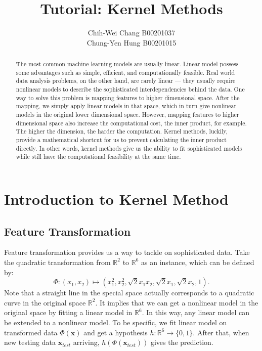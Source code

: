 \documentclass[12pt]{article}
\theoremstyle{definition}
\theoremstyle{remark}
\begin{document}

\title{Tutorial: Kernel Methods}
\author{Chih-Wei Chang B00201037\\
Chung-Yen Hung B00201015}
\maketitle

\begin{abstract}
  The most common machine learning models are usually linear. Linear model possess some advantages such as simple, efficient, and computationally feasible. Real world data analysis problems, on the other hand, are rarely linear --- they usually require nonlinear models to describe the sophisticated interdependencies behind the data. One way to solve this problem is mapping features to higher dimensional space. After the mapping, we simply apply linear models in that space, which in turn give nonlinear models in the original lower dimensional space. However, mapping features to higher dimensional space also increase the computational cost, the inner product, for example. The higher the dimension, the harder the computation. Kernel methods, luckily, provide a mathematical shortcut for us to prevent calculating the inner product directly. In other words, kernel methods give us the ability to fit sophisticated models while still have the computational feasibility at the same time.
\end{abstract}

\section{Introduction to Kernel Method}

\subsection{Feature Transformation}
Feature transformation provides us a way to tackle on sophisticated data. Take the quadratic transformation from \(\mathbb{R}^2\) to \(\mathbb{R}^6\) as an instance, which can be defined by:
\[
  \Phi: (x_1, x_2) \mapsto (x_1^2, x_2^2, \sqrt{2} x_1 x_2, \sqrt{2} x_1, \sqrt{2} x_2, 1).
\]
Note that a straight line in the special space actually corresponds to a quadratic curve in the original space \(\mathbb{R}^2\). It implies that we can get a nonlinear model in the original space by fitting a linear model in \(\mathbb{R}^6\). In this way, any linear model can be extended to a nonlinear model. To be specific, we fit linear model on transformed data \(\Phi(\mathbf{x})\) and get a hypothesis \(h: \mathbb{R}^6 \rightarrow \{0, 1\} \). After that, when new testing data \(\mathbf{x}_{test}\) arriving,  \(h(\Phi(\mathbf{x}_{test}))\) gives the prediction.
\end{document}

